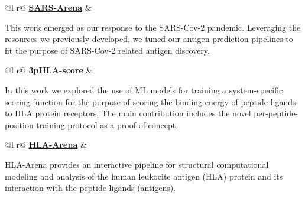 \documentclass[a4paper,12pt]{article}
\begin{document}
\begin{tabularx}{\linewidth}{ @{}l r@{} }
 \href{https://github.com/KavrakiLab/SARS-Arena}{\faGithub \textbf{SARS-Arena}} &\\[3.75pt]
\begin{minipage}[t]{\linewidth}
This work emerged as our response to the SARS-Cov-2 pandemic. Leveraging the resources we previously developed, we tuned our antigen prediction pipelines to fit the purpose of SARS-Cov-2 related antigen discovery. %
\end{minipage}
\end{tabularx}

\begin{tabularx}{\linewidth}{ @{}l r@{} }
 \href{https://github.com/KavrakiLab/3pHLA-score}{\faGithub \textbf{3pHLA-score}} &\\[3.75pt]
\begin{minipage}[t]{\linewidth}
In this work we explored the use of ML models for training a system-specific scoring function for the purpose of scoring the binding energy of peptide ligands to HLA protein receptors. The main contribution includes the novel per-peptide-position training protocol as a proof of concept. %
\end{minipage}
\end{tabularx}

\begin{tabularx}{\linewidth}{ @{}l r@{} }
 \href{https://github.com/KavrakiLab/HLA-Arena}{\faGithub \textbf{HLA-Arena}} &\\[3.75pt]
\begin{minipage}[t]{\linewidth}
HLA-Arena provides an interactive pipeline for structural computational modeling and analysis of the human leukocite antigen (HLA) protein and its interaction with the peptide ligands (antigens). %
\end{minipage}
\end{tabularx}



\end{document}
